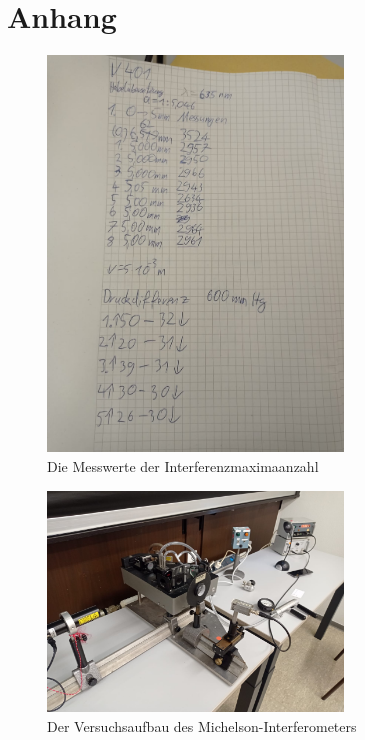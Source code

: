 \newpage
\section{Anhang}

\begin{figure}[h]
    \centering
    \includegraphics[width=0.7\textwidth]{latex/images/messwerte.jpeg}
    \caption{Die Messwerte der Interferenzmaximaanzahl}
    \label{img:mess1}
\end{figure}
  
\begin{figure}[h]
    \centering
    \includegraphics[width=0.7\textwidth]{latex/images/Aufbau.jpeg}
    \caption{Der Versuchsaufbau des Michelson-Interferometers}
\end{figure}